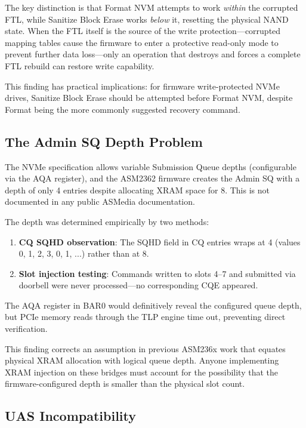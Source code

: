 \documentclass[conference]{IEEEtran}
\begin{document}
The key distinction is that Format NVM attempts to work \emph{within}
the corrupted FTL, while Sanitize Block Erase works \emph{below} it,
resetting the physical NAND state. When the FTL itself is the source of
the write protection---corrupted mapping tables cause the firmware to
enter a protective read-only mode to prevent further data loss---only an
operation that destroys and forces a complete FTL rebuild can restore
write capability.

This finding has practical implications: for firmware write-protected
NVMe drives, Sanitize Block Erase should be attempted before Format NVM,
despite Format being the more commonly suggested recovery command.


\subsection{The Admin SQ Depth Problem}
\label{sec:depth}

The NVMe specification allows variable Submission Queue depths
(configurable via the AQA register), and the ASM2362 firmware creates
the Admin SQ with a depth of only 4 entries despite allocating XRAM
space for 8. This is not documented in any public ASMedia documentation.

The depth was determined empirically by two methods:
\begin{enumerate}
\item \textbf{CQ SQHD observation}: The SQHD field in CQ entries wraps
  at 4 (values 0, 1, 2, 3, 0, 1, ...) rather than at 8.
\item \textbf{Slot injection testing}: Commands written to slots 4--7
  and submitted via doorbell were never processed---no corresponding CQE
  appeared.
\end{enumerate}

The AQA register in BAR0 would definitively reveal the configured queue
depth, but PCIe memory reads through the TLP engine time out, preventing
direct verification.

This finding corrects an assumption in previous ASM236x work that
equates physical XRAM allocation with logical queue depth. Anyone
implementing XRAM injection on these bridges must account for the
possibility that the firmware-configured depth is smaller than the
physical slot count.


\subsection{UAS Incompatibility}
\label{sec:uas-discussion}
\end{document}
